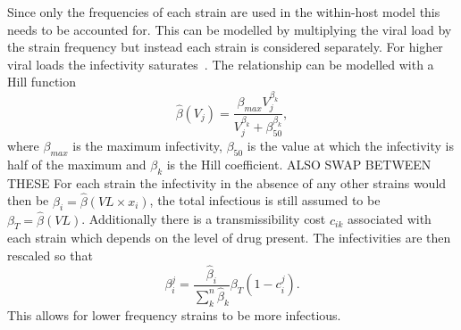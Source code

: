 \documentclass[DIV=15]{scrartcl}
\begin{document}
Since only the  frequencies of each strain are used in the within-host model this needs to be accounted for. This can be modelled by multiplying the viral load by the strain frequency but instead each strain is considered separately. For higher viral loads the infectivity saturates~\cite{fraser2007}.  The relationship can be modelled with a Hill function~\cite{shirreff2011} 
\begin{equation*}
\hat{\beta}(V_j) = \frac{\beta_{max}V_j^{\beta_k}}{V_j^{\beta_k} + \beta_{50}^{\beta_k}},
\end{equation*}
where $ \beta_{max}$ is the maximum infectivity, $\beta_{50}$ is the value at which the infectivity is half of the maximum and $\beta_k$ is the Hill coefficient.
ALSO SWAP BETWEEN THESE
For each strain the infectivity in the absence of any other strains would then be 
$\hat{\beta_i} =  \hat{\beta}(VL \times x_i)$, the total infectious is still assumed to be $\beta_T = \hat{\beta}(VL)$.  Additionally there is a transmissibility  cost $c_{ik}$ associated with each strain which depends on the level  of  drug present. The infectivities are then rescaled so  that 
\begin{equation*}
\beta_{i}^j = \frac{\hat{\beta}_i}{\sum_k^n\hat{\beta}_k }\beta_T(1-c_{i}^j).
\end{equation*}
This allows for lower frequency strains to be more infectious.
  

\end{document}
